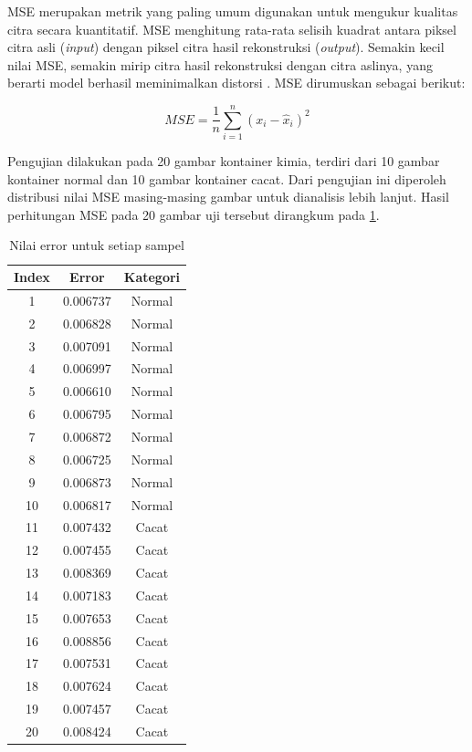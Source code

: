 MSE merupakan metrik yang paling umum digunakan untuk mengukur
kualitas citra secara kuantitatif. MSE menghitung rata-rata selisih
kuadrat antara piksel citra asli (\textit{input}) dengan piksel citra hasil
rekonstruksi (\textit{output}). Semakin kecil nilai MSE, semakin mirip citra
hasil rekonstruksi dengan citra aslinya, yang berarti model berhasil
meminimalkan distorsi \citep{27}. MSE dirumuskan sebagai berikut:

\begin{equation}
  MSE = \frac{1}{n} \sum_{i=1}^{n} (x_i - \hat{x}_i)^2
\end{equation}

Pengujian dilakukan pada 20 gambar kontainer kimia, terdiri dari 10
gambar kontainer normal dan 10 gambar kontainer cacat. Dari pengujian
ini diperoleh distribusi nilai MSE masing-masing gambar untuk
dianalisis lebih lanjut. Hasil perhitungan MSE pada 20 gambar uji
tersebut dirangkum pada \ref{tab:error-samples}.

\begin{table}[H]
  \centering
  \caption{Nilai error untuk setiap sampel}
  \label{tab:error-samples}
  \begin{tabular}{ccc}
    \toprule
    \textbf{Index} & \textbf{Error} & \textbf{Kategori} \\
    \midrule
    1  & 0.006737 & Normal \\
    2  & 0.006828 & Normal \\
    3  & 0.007091 & Normal \\
    4  & 0.006997 & Normal \\
    5  & 0.006610 & Normal \\
    6  & 0.006795 & Normal \\
    7  & 0.006872 & Normal \\
    8  & 0.006725 & Normal \\
    9  & 0.006873 & Normal \\
    10 & 0.006817 & Normal \\
    11 & 0.007432 & Cacat \\
    12 & 0.007455 & Cacat \\
    13 & 0.008369 & Cacat \\
    14 & 0.007183 & Cacat \\
    15 & 0.007653 & Cacat \\
    16 & 0.008856 & Cacat \\
    17 & 0.007531 & Cacat \\
    18 & 0.007624 & Cacat \\
    19 & 0.007457 & Cacat \\
    20 & 0.008424 & Cacat \\
    \bottomrule
  \end{tabular}
\end{table}

